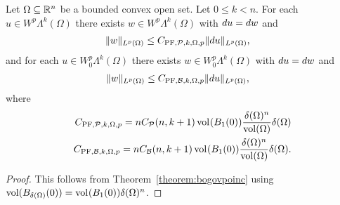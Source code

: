 \documentclass[10pt,a4paper]{article}
\begin{document}
\begin{lemma}\label{lemma:PFexteriorsimplex}
    Let $\Omega \subseteq {\mathbb R}^{n}$ be a bounded convex open set. 
    Let $0 \leq k < n$. 
    For each $u \in W^{p}\Lambda^{k}(\Omega)$ 
    there exists $w \in W^{p}\Lambda^{k}(\Omega)$ 
    with $d u = d w$ and 
    \begin{align*}
        \| w \|_{L^{p}(\Omega)}
        &
        \leq 
        C_{{{\rm PF}},{\mathcal P},k,\Omega,p}
        \| d u \|_{L^{p}(\Omega)}
        ,
    \end{align*}
    and for each $u \in W^{p}_{0}\Lambda^{k}(\Omega)$ 
    there exists $w \in W^{p}_{0}\Lambda^{k}(\Omega)$ 
    with $d u = d w$ and 
    \begin{align*}
        \| w \|_{L^{p}(\Omega)}
        &
        \leq 
        C_{{{\rm PF}},{\mathcal B},k,\Omega,p}
        \| d u \|_{L^{p}(\Omega)}
        ,
    \end{align*}
    where 
    \begin{align*}
        C_{{{\rm PF}},{\mathcal P},k,\Omega,p} 
        = 
        n C_{{\mathcal P}}(n,k+1) 
        \operatorname{vol}_{}(B_1(0)) 
        \frac{ {\delta}(\Omega)^{n} }{ \operatorname{vol}(\Omega) } 
        {\delta}(\Omega)
        \\
        C_{{{\rm PF}},{\mathcal B},k,\Omega,p} 
        = 
        n C_{{\mathcal B}}(n,k+1) 
        \operatorname{vol}_{}(B_1(0)) 
        \frac{ {\delta}(\Omega)^{n} }{ \operatorname{vol}(\Omega) } 
        {\delta}(\Omega)
        .
    \end{align*}
\end{lemma}
\begin{proof}
    This follows from Theorem~\ref{theorem:bogovpoinc} using $\operatorname{vol}(B_{{\delta}(\Omega)}(0)) = \operatorname{vol}_{}(B_1(0)) {\delta}(\Omega)^{n}$.
\end{proof}
\end{document}
